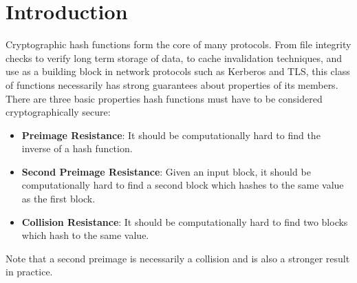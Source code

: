 \documentclass[conference]{IEEEtran}
\begin{document}
\maketitle

\begin{abstract}
The discovery of fast collision attacks in cryptographic hash functions has
traditionally resulted in the immediate deprecation of that hash function.
In this paper we propose five scalable and practical metrics for evaluating
the utility of collision classes based on boolean constraints and show that
the published attacks by X. Wang, Y. Sasaki, P. Kasselman, H. Dobbertin, and
M. Schl{\"a}ffer in MD4 have high utility. We expand on existing attacks by
developing a series of techniques based on logical cryptanalysis to find
over 35,000 collisions in MD4 based on existing collisions, through the novel
definition of a collision neighborhood. We demonstrate new techniques for
inductively building full collisions from reduced round variants of MD4. We
propose these techniques as a mechanism for measuring hash trustworthiness and
discuss potential applications to real-world systems.
\end{abstract}






%
\IEEEpeerreviewmaketitle

\section{Introduction}

Cryptographic hash functions form the core of many protocols. From file
integrity checks to verify long term storage of data, to cache invalidation
techniques, and use as a building block in network protocols such as Kerberos
and TLS, this class of functions necessarily has strong guarantees about
properties of its members. There are three basic properties hash
functions must have to be considered cryptographically secure:
\begin{itemize}
    \item \textbf{Preimage Resistance}: It should be computationally hard to find
        the inverse of a hash function.
    \item \textbf{Second Preimage Resistance}: Given an input block, it should be
        computationally hard to find a second block which hashes to the
        same value as the first block.
    \item \textbf{Collision Resistance}: It should be computationally hard to find two
        blocks which hash to the same value.
\end{itemize}
Note that a second preimage is necessarily a collision and is also a stronger
result in practice.
\end{document}
